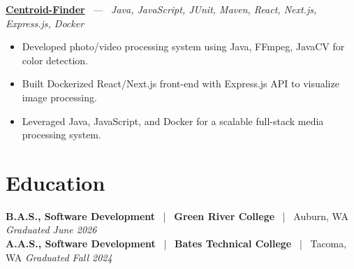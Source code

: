 \documentclass[10pt, letterpaper]{article}
\newcommand{\jobhead}[4]{%
  \vspace{5pt}%
  {\bfseries\color{dark}#1}%
  ~{\color{light}|}~%
  {\bfseries\color{navy}#2}%
  ~{\color{light}|}~%
  {\color{light}#3}%
  \hfill{\color{light}\small\textit{#4}}\\[-2pt]%
}
\newcommand{\projhead}[3]{%
  \vspace{5pt}%
  {\bfseries\color{dark}\href{#2}{#1}}%
  ~{\color{light}---}~%
  {\color{light}\small\textit{#3}}\\[-2pt]%
}
\begin{document}
\projhead{Centroid-Finder}{https://github.com/xavierb117/centroid-finder}{Java, JavaScript, JUnit, Maven, React, Next.js, Express.js, Docker}
\begin{itemize}
  \item Developed photo/video processing system using Java, FFmpeg, JavaCV for color detection.
  \item Built Dockerized React/Next.js front-end with Express.js API to visualize image processing.
  \item Leveraged Java, JavaScript, and Docker for a scalable full-stack media processing system.
\end{itemize}

\section{Education}

\jobhead{B.A.S., Software Development}{Green River College}{Auburn, WA}{Graduated June 2026}
\jobhead{A.A.S., Software Development}{Bates Technical College}{Tacoma, WA}{Graduated Fall 2024}
\end{document}
